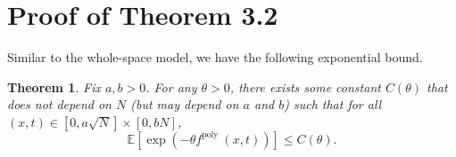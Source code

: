 \documentclass[10pt]{article}
\newtheorem{theorem}{Theorem}[section]
\begin{document}
\section{Proof of Theorem 3.2}

Similar to the whole-space model, we have the following exponential bound.


\begin{theorem}
    Fix $a, b>0$. For any $\theta>0$, there exists some constant $C(\theta)$ that does not depend on $N$ (but may depend on $a$ and $b$) such that for all $(x,t) \in [0, a \sqrt{N}] \times [0, b N]$,
    \begin{equation}
        \mathbb{E}\left[\exp \left(-\theta f^{\text {poly }}(x, t)\right)\right] \leq C(\theta) .
    \end{equation}
\end{theorem}
 
\end{document}
